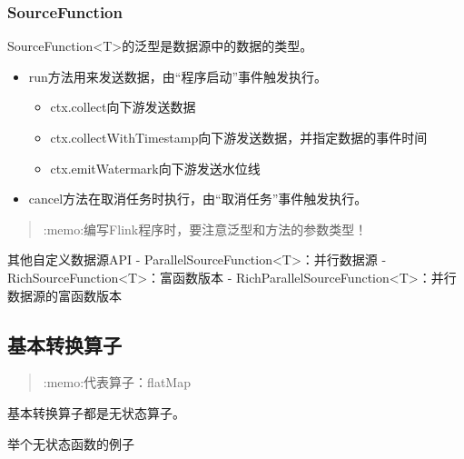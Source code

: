 \hypertarget{sourcefunction}{%
\subsubsection{SourceFunction}\label{sourcefunction}}

SourceFunction\textless T\textgreater 的泛型是数据源中的数据的类型。

\begin{itemize}
\tightlist
\item
  run方法用来发送数据，由``程序启动''事件触发执行。

  \begin{itemize}
  \tightlist
  \item
    ctx.collect向下游发送数据
  \item
    ctx.collectWithTimestamp向下游发送数据，并指定数据的事件时间
  \item
    ctx.emitWatermark向下游发送水位线
  \end{itemize}
\item
  cancel方法在取消任务时执行，由``取消任务''事件触发执行。
\end{itemize}

\begin{quote}
:memo:编写Flink程序时，要注意泛型和方法的参数类型！
\end{quote}

其他自定义数据源API -
ParallelSourceFunction\textless T\textgreater：并行数据源 -
RichSourceFunction\textless T\textgreater：富函数版本 -
RichParallelSourceFunction\textless T\textgreater：并行数据源的富函数版本

\hypertarget{ux57faux672cux8f6cux6362ux7b97ux5b50}{%
\subsection{基本转换算子}\label{ux57faux672cux8f6cux6362ux7b97ux5b50}}

\begin{quote}
:memo:代表算子：flatMap
\end{quote}

基本转换算子都是{无状态算子}。

举个无状态函数的例子

\begin{Shaded}
\begin{Highlighting}[]
\OperatorTok{(}\OperatorTok{)} \OperatorTok{\{}
  \OperatorTok{+} \OperatorTok{;}
\OperatorTok{\}}
\end{Highlighting}
\end{Shaded}

